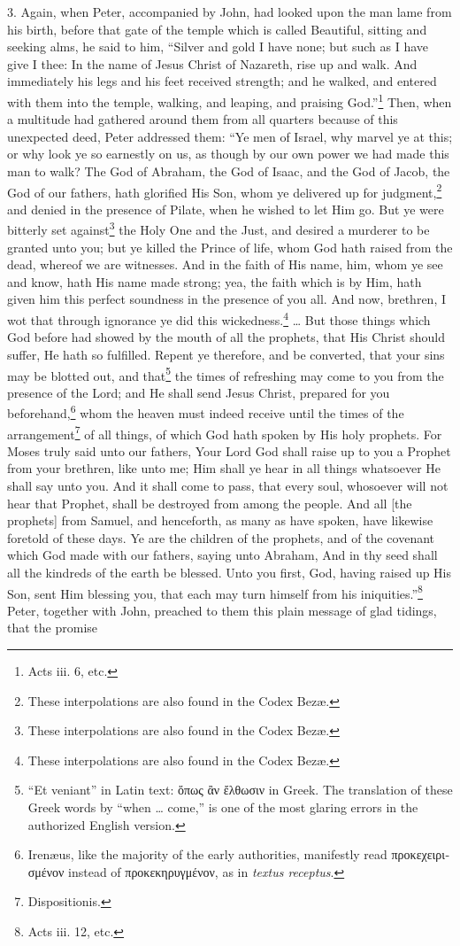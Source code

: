 3. Again, when Peter, accompanied by John, had looked upon the man lame from his birth, before that gate of the temple which is called Beautiful, sitting and seeking alms, he said to him, “Silver and gold I have none; but such as I have give I thee: In the name of Jesus Christ of Nazareth, rise up and walk. And immediately his legs and his feet received strength; and he walked, and entered with them into the temple, walking, and leaping, and praising God.”\footnote{Acts iii. 6, etc.} Then, when a multitude had gathered around them from all quarters because of this unexpected deed, Peter addressed them: “Ye men of Israel, why marvel ye at this; or why look ye so earnestly on us, as though by our own power we had made this man to walk? The God of Abraham, the God of Isaac, and the God of Jacob, the God of our fathers, hath glorified His Son, whom ye delivered up for judgment,\footnote{These interpolations are also found in the Codex Bezæ.} and denied in the presence of Pilate, when he wished to let Him go. But ye were bitterly set against\footnote{These interpolations are also found in the Codex Bezæ.} the Holy One and the Just, and desired a murderer to be granted unto you; but ye killed the Prince of life, whom God hath raised from the dead, whereof we are witnesses. And in the faith of His name, him, whom ye see and know, hath His name made strong; yea, the faith which is by Him, hath given him this perfect soundness in the presence of you all. And now, brethren, I wot that through ignorance ye did this wickedness.\footnote{These interpolations are also found in the Codex Bezæ.} … But those things which God before had showed by the mouth of all the prophets, that His Christ should suffer, He hath so fulfilled. Repent ye therefore, and be converted, that your sins may be blotted out, and that\footnote{“Et veniant” in Latin text: \textgreek{ὅπως ἂν ἔλθωσιν} in Greek. The translation of these Greek words by “when … come,” is one of the most glaring errors in the authorized English version.} the times of refreshing  may come to you from the presence of the Lord; and He shall send Jesus Christ, prepared for you beforehand,\footnote{Irenæus, like the majority of the early authorities, manifestly read \textgreek{προκεχειρισμένον} instead of \textgreek{προκεκηρυγμένον}, as in \emph{textus receptus}.} whom the heaven must indeed receive until the times of the arrangement\footnote{Dispositionis.} of all things, of which God hath spoken by His holy prophets. For Moses truly said unto our fathers, Your Lord God shall raise up to you a Prophet from your brethren, like unto me; Him shall ye hear in all things whatsoever He shall say unto you. And it shall come to pass, that every soul, whosoever will not hear that Prophet, shall be destroyed from among the people. And all [the prophets] from Samuel, and henceforth, as many as have spoken, have likewise foretold of these days. Ye are the children of the prophets, and of the covenant which God made with our fathers, saying unto Abraham, And in thy seed shall all the kindreds of the earth be blessed. Unto you first, God, having raised up His Son, sent Him blessing you, that each may turn himself from his iniquities.”\footnote{Acts iii. 12, etc.} Peter, together with John, preached to them this plain message of glad tidings, that the promise 